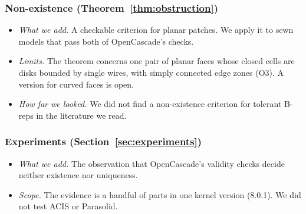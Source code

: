 \subsubsection*{Non-existence (Theorem~\ref{thm:obstruction})}
\begin{itemize}
\item \emph{What we add.} A checkable criterion for planar patches. We apply it to sewn models that pass both of
OpenCascade's checks.
\item \emph{Limits.} The theorem concerns one pair of planar faces whose closed cells are disks bounded by single wires,
with simply connected edge zones (O3). A version for curved faces is open.
\item \emph{How far we looked.} We did not find a non-existence criterion for tolerant B-reps in the literature we
read.
\end{itemize}

\subsubsection*{Experiments (Section~\ref{sec:experiments})}
\begin{itemize}
\item \emph{What we add.} The observation that OpenCascade's validity checks decide neither existence nor uniqueness.
\item \emph{Scope.} The evidence is a handful of parts in one kernel version (8.0.1). We did not test ACIS or
Parasolid.
\end{itemize}
